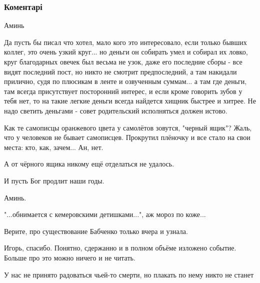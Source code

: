  
 
 
 
 
\subsubsection{Коментарі}
\label{sec:30_05_2018.fb.lesev_igor.1.babchenko.cmt}

\begin{itemize} %
Аминь


Да пусть бы писал что хотел, мало кого это интересовало, если только бывших
коллег, это очень узкий круг... но деньги он собирать умел и собирал их ловко,
круг благодарных овечек был весьма не узок, даже его последние сборы - все
видят последний пост, но никто не смотрит предпоследний, а там накидали
прилично, судя по плюсикам в ленте и озвученным суммам... а там где деньги, там
всегда присутствует посторонний интерес, и если кроме говорить зубов у тебя
нет, то на такие легкие деньги всегда найдется хищник быстрее и хитрее. Не надо
светить деньгами - совет родительский исполняться должен истово.



Как те самописцы оранжевого цвета у самолётов зовутся, "черный ящик"? Жаль, что
у человеков не бывает самописцев. Прокрутил плёночку и все стало на свои места:
кто, как, зачем... Ан, нет.

А от чёрного ящика никому ещё отделаться не удалось.

И пусть Бог продлит наши годы.


Аминь.

"...обнимается с кемеровскими детишками...", аж мороз по коже...

Верите, про существование Бабченко только вчера и узнала.

Игорь, спасибо. Понятно, сдержанно и в полном объёме изложено событие. Больше про это можно ничего и не читать.

У нас не принято радоваться чьей-то смерти, но плакать по нему никто не станет


\end{itemize}
